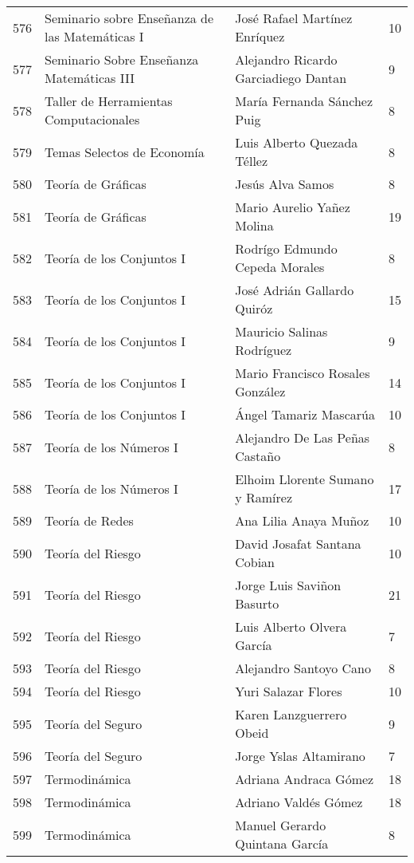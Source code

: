 \begin{table}[ht]
\begin{tabular}{rlll}
  576 & Seminario sobre Enseñanza de las Matemáticas I & José Rafael Martínez Enríquez & 10 \\ 
  577 & Seminario Sobre Enseñanza Matemáticas III & Alejandro Ricardo Garciadiego Dantan & 9 \\ 
  578 & Taller de Herramientas Computacionales & María Fernanda Sánchez Puig & 8 \\ 
  579 & Temas Selectos de Economía & Luis Alberto Quezada Téllez & 8 \\ 
  580 & Teoría de Gráficas & Jesús Alva Samos & 8 \\ 
  581 & Teoría de Gráficas & Mario Aurelio Yañez Molina & 19 \\ 
  582 & Teoría de los Conjuntos I & Rodrígo Edmundo Cepeda Morales & 8 \\ 
  583 & Teoría de los Conjuntos I & José Adrián Gallardo Quiróz & 15 \\ 
  584 & Teoría de los Conjuntos I & Mauricio Salinas Rodríguez & 9 \\ 
  585 & Teoría de los Conjuntos I & Mario Francisco Rosales González & 14 \\ 
  586 & Teoría de los Conjuntos I & Ángel Tamariz Mascarúa & 10 \\ 
  587 & Teoría de los Números I & Alejandro De Las Peñas Castaño & 8 \\ 
  588 & Teoría de los Números I & Elhoim Llorente Sumano y Ramírez & 17 \\ 
  589 & Teoría de Redes & Ana Lilia Anaya Muñoz & 10 \\ 
  590 & Teoría del Riesgo & David Josafat Santana Cobian & 10 \\ 
  591 & Teoría del Riesgo & Jorge Luis Saviñon Basurto & 21 \\ 
  592 & Teoría del Riesgo & Luis Alberto Olvera García & 7 \\ 
  593 & Teoría del Riesgo & Alejandro Santoyo Cano & 8 \\ 
  594 & Teoría del Riesgo & Yuri Salazar Flores & 10 \\ 
  595 & Teoría del Seguro & Karen Lanzguerrero Obeid & 9 \\ 
  596 & Teoría del Seguro & Jorge Yslas Altamirano & 7 \\ 
  597 & Termodinámica & Adriana Andraca Gómez & 18 \\ 
  598 & Termodinámica & Adriano Valdés Gómez & 18 \\ 
  599 & Termodinámica & Manuel Gerardo Quintana García & 8 \\ 

\end{tabular}
\end{table}
